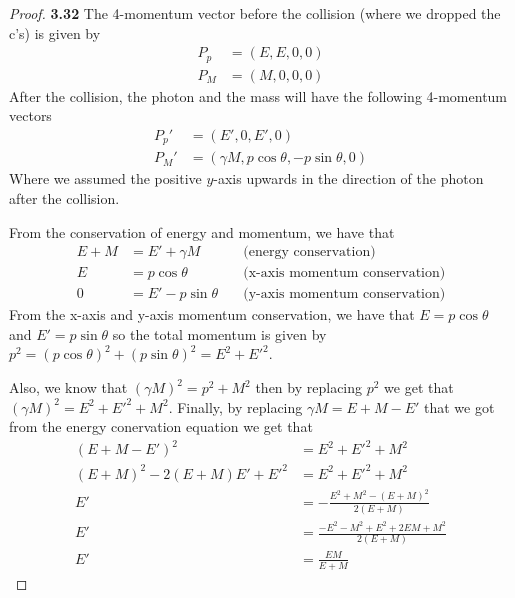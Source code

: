 \documentclass[11pt]{article}
\theoremstyle{definition}
\begin{document}
\cleardoublepage
\begin{proof}{\textbf{3.32}}
    The 4-momentum vector before the collision (where we dropped the c's) is
    given by
    \begin{align*}
        P_p &= (E, E, 0, 0)\\
        P_M &= (M ,0 ,0 ,0)
    \end{align*}
    After the collision, the photon and the mass will have the following
    4-momentum vectors
    \begin{align*}
        P_{p}' &= (E', 0, E', 0)\\
        P_{M}' &= (\gamma M, p\cos\theta, -p\sin\theta, 0)
    \end{align*}
    Where we assumed the positive $y$-axis upwards in the direction of the
    photon after the collision.

    From the conservation of energy and momentum, we have that
    \begin{align*}
        E + M &= E' + \gamma M &\quad\text{(energy conservation)}\\
        E &= p \cos\theta &\quad\text{(x-axis momentum conservation)}\\
        0 &= E' - p\sin\theta &\quad\text{(y-axis momentum conservation)}
    \end{align*}
    From the x-axis and y-axis momentum conservation, we have that
    $E = p\cos\theta$ and $E' = p \sin\theta$ so the total momentum is given
    by $p^2 = (p\cos\theta)^2 + (p\sin\theta)^2 = E^2 + E'^2$.

    Also, we know that $(\gamma M)^2 = p^2 + M^2$ then by replacing
    $p^2$ we get that $(\gamma M)^2 = E^2 + E'^2 + M^2$.
    Finally, by replacing $\gamma M = E + M - E'$ that we got from the energy
    conervation equation we get that
    \begin{align*}
        (E + M - E')^2 &= E^2 + E'^2 + M^2\\
        (E+ M)^2 - 2(E+ M)E' + E'^2 &= E^2 + E'^2 + M^2\\
        E' &= -\frac{E^2 + M^2 - (E+M)^2}{2(E + M)}\\
        E' &= \frac{-E^2 - M^2 + E^2 +2EM + M^2}{2(E + M)}\\
        E' &= \frac{EM}{E+M}
    \end{align*}
\end{proof}
\cleardoublepage
\end{document}

